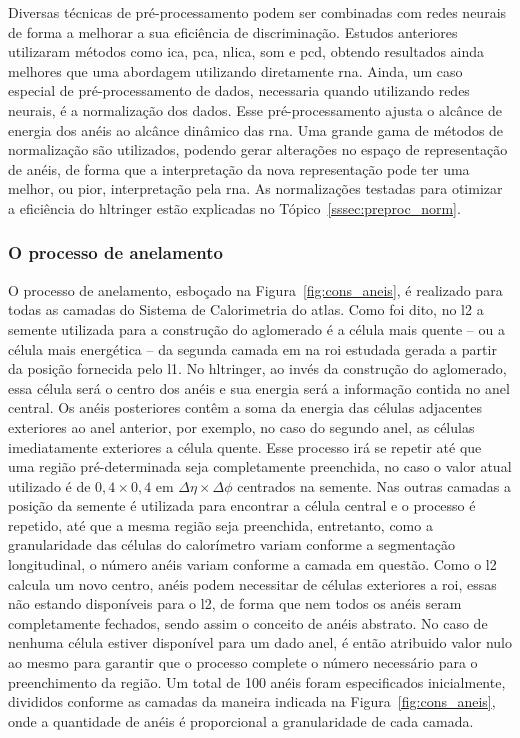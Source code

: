 Diversas técnicas de pré-processamento podem ser combinadas com redes neurais de
forma a melhorar a sua eficiência de discriminação. Estudos anteriores
\cite{tese_eduardo,tese_torres} utilizaram métodos como \gls{ica}, \gls{pca},
\gls{nlica}, \gls{som} e \gls{pcd}, obtendo resultados ainda melhores que uma
abordagem utilizando diretamente \gls{rna}. Ainda, um caso especial de pré-processamento 
de dados, necessaria quando utilizando redes neurais, é a normalização dos dados. Esse 
pré-processamento ajusta o alcânce de energia dos anéis ao alcânce dinâmico das
\gls{rna}. Uma grande gama de métodos de normalização são utilizados, podendo
gerar alterações no espaço de representação de anéis, de forma que a
interpretação da nova representação pode ter uma melhor, ou pior, interpretação
pela \gls{rna}. As normalizações testadas para otimizar a eficiência do
\gls{hltringer} estão explicadas no Tópico~\ref{sssec:preproc_norm}.


\subsubsection{O processo de anelamento}
\label{sssec:anelamento}

O processo de anelamento, esboçado na Figura~\ref{fig:cons_aneis}, é realizado
para todas as camadas do Sistema de Calorimetria do \gls{atlas}. Como foi dito,
no \gls{l2} a semente utilizada para a construção do aglomerado é a célula mais quente  -- ou a célula mais
energética -- da segunda camada \gls{em} na \gls{roi} estudada gerada a partir da posição 
fornecida pelo \gls{l1}. No \gls{hltringer}, ao invés da construção do
aglomerado, essa célula será o centro dos anéis e sua energia será a informação
contida no anel central. Os anéis posteriores contêm a soma da energia das células adjacentes
exteriores ao anel anterior, por exemplo, no caso do segundo anel, as células imediatamente
exteriores a célula quente. Esse processo irá se repetir até que uma região pré-determinada seja
completamente preenchida, no caso o valor atual utilizado é de $0,4\times0,4$ em
$\Delta\eta\times\Delta\phi$ centrados na semente. Nas outras camadas a posição da
semente é utilizada para encontrar a célula central e o processo é repetido, até
que a mesma região seja preenchida, entretanto, como a granularidade das células
do calorímetro variam conforme a segmentação longitudinal, o número anéis variam
conforme a camada em questão. Como o \gls{l2} calcula
um novo centro, anéis podem necessitar de células exteriores a \gls{roi}, essas não
estando disponíveis para o \gls{l2}, de forma que nem todos os anéis seram
completamente fechados, sendo assim o conceito de anéis abstrato. No caso de
nenhuma célula estiver disponível para um dado anel, é então atribuido valor
nulo ao mesmo para garantir que o processo complete o número necessário para o
preenchimento da região. Um total de 100 anéis foram especificados inicialmente,
divididos conforme as camadas da maneira indicada na Figura~\ref{fig:cons_aneis}, 
onde a quantidade de anéis é proporcional a granularidade de cada camada.


